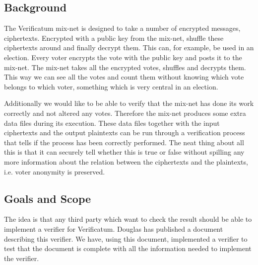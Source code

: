 \subsection{Background}

The Verificatum mix-net is designed to take a number of encrypted messages, ciphertexts. Encrypted with a public key from the mix-net, shuffle these ciphertexts around and finally decrypt them. This can, for example, be used in an election. Every voter encrypts the vote with the public key and posts it to the mix-net. The mix-net takes all the encrypted votes, shuffles and decrypts them. This way we can see all the votes and count them without knowing which vote belongs to which voter, something which is very central in an election.

Additionally we would like to be able to verify that the mix-net has done its work correctly and not altered any votes. Therefore the mix-net produces some extra data files during its execution. These data files together with the input ciphertexts and the output plaintexts can be run through a verification process that tells if the process has been correctly performed. The neat thing about all this is that it can securely tell whether this is true or false without spilling any more information about the relation between the ciphertexts and the plaintexts, i.e. voter anonymity is preserved.

\subsection{Goals and Scope}

The idea is that any third party which want to check the result should be able to implement a verifier for Verificatum. Douglas has published a document describing this verifier. We have, using this document, implemented a verifier to test that the document is complete with all the information needed to implement the verifier.
